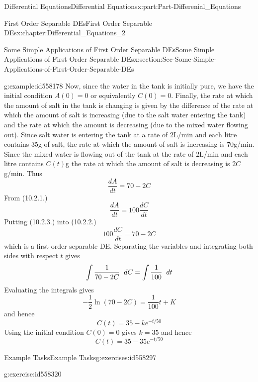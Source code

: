 \documentclass[oneside,10pt,]{book}
\numberwithin{equation}{section}
\begin{document}
\begin{partptx}{Differential Equations}{}{Differential Equations}{}{}{x:part:Part-Differenial_Equations}
\begin{chapterptx}{First Order Separable DEs}{}{First Order Separable DEs}{}{}{x:chapter:Differential_Equations_2}
\begin{sectionptx}{Some Simple Applications of First Order Separable DEs}{}{Some Simple Applications of First Order Separable DEs}{}{}{x:section:Sec-Some-Simple-Applications-of-First-Order-Separable-DEs}
\begin{example}{}{g:example:id558178}
Now, since the water in the tank is initially pure, we have the initial condition \(A(0)=0\) or equivalently \(C(0)=0\). Finally, the rate at which the amount of salt in the tank is changing is given by the difference of the rate at which the amount of salt is increasing (due to the salt water entering the tank) and the rate at which the amount is decreasing (due to the mixed water flowing out). Since salt water is entering the tank at a rate of \(2\)L\slash{}min and each litre contains \(35\)g of salt, the rate at which the amount of salt is increasing is \(70\)g\slash{}min. Since the mixed water is flowing out of the tank at the rate of \(2\)L\slash{}min and each litre contains \(C(t)\)g the rate at which the amount of salt is decreasing is \(2C\)g\slash{}min. Thus%
\begin{equation}
\frac{dA}{dt}=70-2C\label{g:men:id558252}
\end{equation}
From (10.2.1.)%
\begin{equation}
\frac{dA}{dt}=100\frac{dC}{dt}\label{g:men:id558258}
\end{equation}
Putting (10.2.3.) into (10.2.2.)%
\begin{equation*}
100\frac{dC}{dt}=70-2C
\end{equation*}
which is a first order separable DE. Separating the variables and integrating both sides with respect \(t\) gives%
\begin{equation*}
\int \frac{1}{70-2C}\hspace{2mm} dC=\int \frac{1}{100}\hspace{2mm}dt
\end{equation*}
Evaluating the integrals gives%
\begin{equation*}
-\frac{1}{2}\ln(70-2C)=\frac{1}{100}t+K
\end{equation*}
and hence%
\begin{equation*}
C(t)=35-ke^{-t/50}
\end{equation*}
Using the initial condition \(C(0)=0\) gives \(k=35\) and hence%
\begin{equation*}
C(t)=35-35e^{-t/50}
\end{equation*}
%
\end{example}
%
%
\typeout{************************************************}
\typeout{************************************************}
%
\begin{exercises-subsection-numberless}{Example Tasks}{}{Example Tasks}{}{}{g:exercises:id558297}
\begin{divisionexercise}{1}{}{}{g:exercise:id558320}%

\end{divisionexercise}
\end{exercises-subsection-numberless}
\end{sectionptx}
\end{chapterptx}
\end{partptx}
\end{document}
